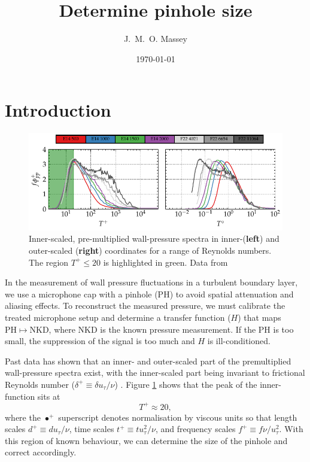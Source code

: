\documentclass[11pt,a4paper]{article}
\title{Determine pinhole size}
\author{J.~M.~O. Massey}
\date{\today}
\begin{document}
\maketitle
\section{Introduction}

    \begin{figure}
        \centering
        \includegraphics{figures/1_bl.pdf}
        \caption{Inner-scaled, pre-multiplied wall-pressure spectra in inner-(\textbf{left}) and outer-scaled (\textbf{right}) coordinates for a range of Reynolds numbers. The region $T^+\leq 20$ is highlighted in green. Data from \citet{eitel-amor_simulation_2014,fritsch_pressure_2020,fritsch_fluctuating_2022}}
    \label{fig:bl_spectra}
    \end{figure}

    In the measurement of wall pressure fluctuations in a turbulent boundary layer, we use a microphone cap with a pinhole (PH) to avoid spatial attenuation and aliasing effects. To reconstruct the measured pressure, we must calibrate the treated microphone setup and determine a transfer function ($H$) that maps $\mathrm{PH}\mapsto \mathrm{NKD}$, where NKD is the known pressure measurement. If the PH is too small, the suppression of the signal is too much and $H$ is ill-conditioned.

    Past data has shown that an inner- and outer-scaled part of the premultiplied wall-pressure spectra exist, with the inner-scaled part being invariant to frictional Reynolds number ($\delta^+\equiv \delta u_\tau / \nu$) \citep{massey_eddy_2025}. Figure \ref{fig:bl_spectra} shows that the peak of the inner-function sits at
    \begin{equation}
        T^+\approx 20 ,
    \label{eq: temporal filter}
    \end{equation}
    where the $\bullet^+$ superscript denotes normalisation by viscous units so that length scales $d^+\equiv d u_\tau/\nu$, time scales $t^+\equiv t u_\tau^2/\nu$, and frequency scales $f^+\equiv f \nu / u_\tau^2$. With this region of known behaviour, we can determine the size of the pinhole and correct accordingly.
\end{document}
